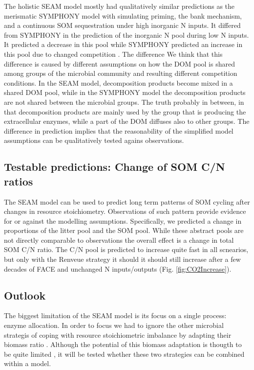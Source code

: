 The holistic SEAM model mostly had qualitatively similar predictions as the
merismatic SYMPHONY model with simulating priming, the bank mechanism, and a
continuous SOM sequestration under high inorganic N inputs. It differed from
SYMPHONY in the prediction of the inorganic N pool during low N inputs. It
predicted a decrease in this pool while SYMPHONY predicted an increase in this
pool due to changed competition \citep{Perveen14}. The difference We think that
this difference is caused by different assumptions on how the DOM pool is shared
among groups of the microbial community and resulting different competition
conditions. In the SEAM model, decomposition products become mixed in a shared
DOM pool, while in the SYMPHONY model the decomposition products are not shared
between the microbial groups.
The truth probably in between, in that decomposition products are mainly used by
the group that is producing the extracellular enzymes, while a part of the DOM
diffuses also to other groups.
The difference in prediction implies that the reasonability of the simplified
model assumptions can be qualitatively tested agains observations.

\subsection{Testable predictions: Change of SOM C/N ratios}
The SEAM model can be used to predict long term patterns of SOM cycling
after changes in resource stoichiometry. Observations of such pattern 
provide evidence for or against the modelling assumptions.
Specifically, we predicted a change in proportions of the litter pool and the
SOM pool. While these abstract pools are not directly comparable to observations
the overall effect is a change in total SOM C/N ratio. The C/N pool is
predicted to increase quite fast in all scnearios, but only with
the Renveue strategy it should it should still increase after a few decades of
FACE and unchanged N inputs/outputs (Fig. \ref{fig:CO2Increase}).
 
\subsection{Outlook}
The biggest limitation of the SEAM model is its focus on a single process:
enzyme allocation. In order to focus we had to ignore the other microbial
strategis of coping with resource stoichiometric imbalance by adapting their
biomass ratio \citep{XXRastetter}. Although the potential of this biomass
adaptation is thougth to be quite limited \citep{Mooshammer14}, it will be
tested whether these two strategies can be combined within a model.

